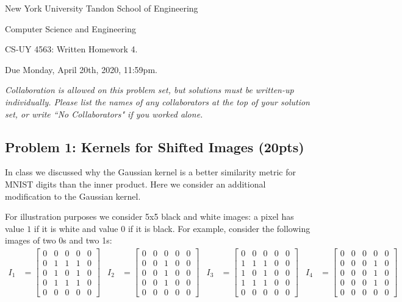 \documentclass[10pt]{article}
\begin{document}
	
\begin{center}
	\normalsize
	New York University Tandon School of Engineering
	
	Computer Science and Engineering
	\medskip
	
	\large
	CS-UY 4563: Written Homework 4. 
	
	Due Monday,  April 20th, 2020, 11:59pm.
	\medskip
	
	\normalsize 
	\noindent \emph{Collaboration is allowed on this problem set, but solutions must be written-up individually. Please list the names of any collaborators at the top of your solution set, or write ``No Collaborators" if you worked alone.}
	\medskip
\end{center} 

\subsection{Problem 1: Kernels for Shifted Images (20pts)}
In class we discussed why the Gaussian kernel is a better similarity metric for MNIST digits than the inner product. Here we consider an additional modification to the Gaussian kernel.

For illustration purposes we consider 5x5 black and white images: a pixel has value $1$ if it is white and value $0$ if it is black. For example, consider the following images of two 0s and two 1s:
\begin{align*}
I_1 &= \begin{bmatrix}
0 & 0 & 0 & 0 & 0 \\
0 & 1 & 1 & 1 & 0 \\
0 & 1 & 0 & 1 & 0 \\
0 & 1 & 1 & 1 & 0 \\
0 & 0 & 0 & 0 & 0 
\end{bmatrix} 
& I_2 &= \begin{bmatrix}
0 & 0 & 0 & 0 & 0 \\
0 & 0 & 1 & 0 & 0 \\
0 & 0 & 1 & 0 & 0 \\
0 & 0 & 1 & 0 & 0 \\
0 & 0 & 0 & 0 & 0 
\end{bmatrix} 
& I_3 &= \begin{bmatrix}
0 & 0 & 0 & 0 & 0 \\
1 & 1 & 1 & 0 & 0 \\
1 & 0 & 1 & 0 & 0 \\
1 & 1 & 1 & 0 & 0 \\
0 & 0 & 0 & 0 & 0 
\end{bmatrix} 
& I_4 &= \begin{bmatrix}
0 & 0 & 0 & 0 & 0 \\
0 & 0 & 0 & 1 & 0 \\
0 & 0 & 0 & 1 & 0 \\
0 & 0 & 0 & 1 & 0 \\
0 & 0 & 0 & 0 & 0 
\end{bmatrix}
\end{align*}
\end{document}
